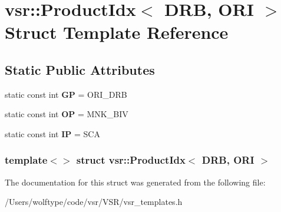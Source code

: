 \hypertarget{structvsr_1_1_product_idx_3_01_d_r_b_00_01_o_r_i_01_4}{\section{vsr\-:\-:Product\-Idx$<$ D\-R\-B, O\-R\-I $>$ Struct Template Reference}
\label{structvsr_1_1_product_idx_3_01_d_r_b_00_01_o_r_i_01_4}
}
\subsection*{Static Public Attributes}
\begin{DoxyCompactItemize}
\item 
\hypertarget{structvsr_1_1_product_idx_3_01_d_r_b_00_01_o_r_i_01_4_aa375a9b42dac4354d4ff77168672a199}{static const int {\bfseries G\-P} = O\-R\-I\-\_\-\-D\-R\-B}\label{structvsr_1_1_product_idx_3_01_d_r_b_00_01_o_r_i_01_4_aa375a9b42dac4354d4ff77168672a199}

\item 
\hypertarget{structvsr_1_1_product_idx_3_01_d_r_b_00_01_o_r_i_01_4_a5df97edb99b2e1a1d9075431e7055ce6}{static const int {\bfseries O\-P} = M\-N\-K\-\_\-\-B\-I\-V}\label{structvsr_1_1_product_idx_3_01_d_r_b_00_01_o_r_i_01_4_a5df97edb99b2e1a1d9075431e7055ce6}

\item 
\hypertarget{structvsr_1_1_product_idx_3_01_d_r_b_00_01_o_r_i_01_4_a8f89e4d722d8ecd98148fa304db44fb4}{static const int {\bfseries I\-P} = S\-C\-A}\label{structvsr_1_1_product_idx_3_01_d_r_b_00_01_o_r_i_01_4_a8f89e4d722d8ecd98148fa304db44fb4}

\end{DoxyCompactItemize}
\subsubsection*{template$<$$>$ struct vsr\-::\-Product\-Idx$<$ D\-R\-B, O\-R\-I $>$}



The documentation for this struct was generated from the following file\-:\begin{DoxyCompactItemize}
\item 
/\-Users/wolftype/code/vsr/\-V\-S\-R/vsr\-\_\-templates.\-h\end{DoxyCompactItemize}
